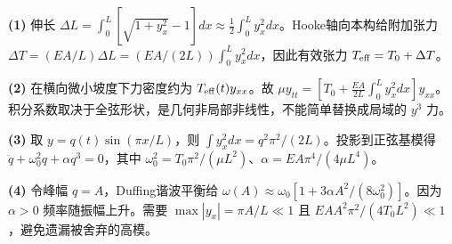 \par\noindent\textbf{(1)} 伸长 \(\Delta L=\int_0^L[\sqrt{1+y_x^2}-1]dx\approx\frac12\int_0^Ly_x^2dx\)。Hooke轴向本构给附加张力 \(\Delta T=(EA/L)\Delta L=(EA/(2L))\int_0^Ly_x^2dx\)，因此有效张力 \(T_{\rm eff}=T_0+\Delta T\)。
\par\noindent\textbf{(2)} 在横向微小坡度下力密度约为 \(T_{\rm eff}(t)y_{xx}\)。故 \(\mu y_{tt}=[T_0+\frac{EA}{2L}\int_0^Ly_x^2dx]y_{xx}\)。积分系数取决于全弦形状，是几何非局部非线性，不能简单替换成局域的 \(y^3\) 力。
\par\noindent\textbf{(3)} 取 \(y=q(t)\sin(\pi x/L)\)，则 \(\int y_x^2dx=q^2\pi^2/(2L)\)。投影到正弦基模得 \(\ddot q+\omega_0^2q+\alpha q^3=0\)，其中 \(\omega_0^2=T_0\pi^2/(\mu L^2)\)、\(\alpha=EA\pi^4/(4\mu L^4)\)。
\par\noindent\textbf{(4)} 令峰幅 \(q=A\)，Duffing谐波平衡给 \(\omega(A)\approx\omega_0[1+3\alpha A^2/(8\omega_0^2)]\)。因为 \(\alpha>0\) 频率随振幅上升。需要 \(\max|y_x|=\pi A/L\ll1\) 且 \(EA A^2\pi^2/(4T_0L^2)\ll1\)，避免遗漏被舍弃的高模。
